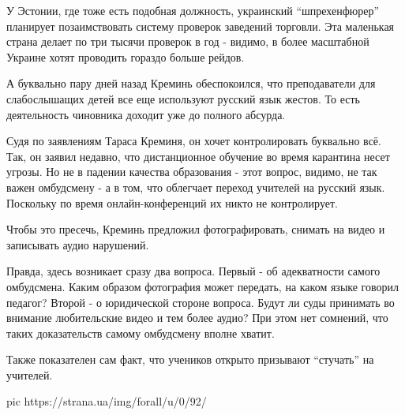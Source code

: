 У Эстонии, где тоже есть подобная должность, украинский \enquote{шпрехенфюрер}
планирует позаимствовать систему проверок заведений торговли. Эта маленькая
страна делает по три тысячи проверок в год - видимо, в более масштабной Украине
хотят проводить гораздо больше рейдов. 

А буквально пару дней назад Креминь обеспокоился, что преподаватели для
слабослышащих детей все еще используют русский язык жестов. То есть
деятельность чиновника доходит уже до полного абсурда. 

Судя по заявлениям Тараса Креминя, он хочет контролировать буквально всё. Так,
он заявил недавно, что дистанционное обучение во время карантина несет угрозы.
Но не в падении качества образования - этот вопрос, видимо, не так важен
омбудсмену - а в том, что облегчает переход учителей на русский язык. Поскольку
по время онлайн-конференций их никто не контролирует.

Чтобы это пресечь, Креминь предложил фотографировать, снимать на видео и
записывать аудио нарушений.

Правда, здесь возникает сразу два вопроса. Первый - об адекватности самого
омбудсмена. Каким образом фотография может передать, на каком языке говорил
педагог? Второй - о юридической стороне вопроса. Будут ли суды принимать во
внимание любительские видео и тем более аудио? При этом нет сомнений, что таких
доказательств самому омбудсмену вполне хватит.

Также показателен сам факт, что учеников открыто призывают \enquote{стучать} на
учителей. 

\ifcmt
pic https://strana.ua/img/forall/u/0/92/%
\fi
